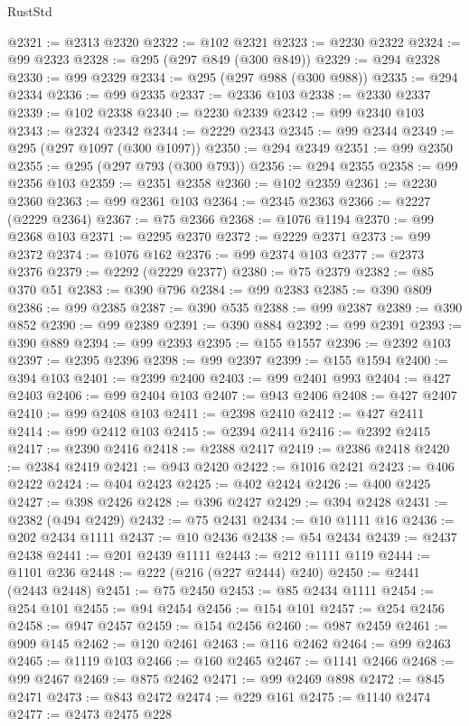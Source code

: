 \begin{lexlean}{RustStd}
\begin{coremodule}
@2321 := @2313 @2320
@2322 := @102 @2321
@2323 := @2230 @2322
@2324 := @99 @2323
@2328 := @295 (@297 @849 (@300 @849))
@2329 := @294 @2328
@2330 := @99 @2329
@2334 := @295 (@297 @988 (@300 @988))
@2335 := @294 @2334
@2336 := @99 @2335
@2337 := @2336 @103
@2338 := @2330 @2337
@2339 := @102 @2338
@2340 := @2230 @2339
@2342 := @99 @2340 @103
@2343 := @2324 @2342
@2344 := @2229 @2343
@2345 := @99 @2344
@2349 := @295 (@297 @1097 (@300 @1097))
@2350 := @294 @2349
@2351 := @99 @2350
@2355 := @295 (@297 @793 (@300 @793))
@2356 := @294 @2355
@2358 := @99 @2356 @103
@2359 := @2351 @2358
@2360 := @102 @2359
@2361 := @2230 @2360
@2363 := @99 @2361 @103
@2364 := @2345 @2363
@2366 := @2227 (@2229 @2364)
@2367 := @75 @2366
@2368 := @1076 @1194
@2370 := @99 @2368 @103
@2371 := @2295 @2370
@2372 := @2229 @2371
@2373 := @99 @2372
@2374 := @1076 @162
@2376 := @99 @2374 @103
@2377 := @2373 @2376
@2379 := @2292 (@2229 @2377)
@2380 := @75 @2379
@2382 := @85 @370 @51
@2383 := @390 @796
@2384 := @99 @2383
@2385 := @390 @809
@2386 := @99 @2385
@2387 := @390 @535
@2388 := @99 @2387
@2389 := @390 @852
@2390 := @99 @2389
@2391 := @390 @884
@2392 := @99 @2391
@2393 := @390 @889
@2394 := @99 @2393
@2395 := @155 @1557
@2396 := @2392 @103
@2397 := @2395 @2396
@2398 := @99 @2397
@2399 := @155 @1594
@2400 := @394 @103
@2401 := @2399 @2400
@2403 := @99 @2401 @993
@2404 := @427 @2403
@2406 := @99 @2404 @103
@2407 := @943 @2406
@2408 := @427 @2407
@2410 := @99 @2408 @103
@2411 := @2398 @2410
@2412 := @427 @2411
@2414 := @99 @2412 @103
@2415 := @2394 @2414
@2416 := @2392 @2415
@2417 := @2390 @2416
@2418 := @2388 @2417
@2419 := @2386 @2418
@2420 := @2384 @2419
@2421 := @943 @2420
@2422 := @1016 @2421
@2423 := @406 @2422
@2424 := @404 @2423
@2425 := @402 @2424
@2426 := @400 @2425
@2427 := @398 @2426
@2428 := @396 @2427
@2429 := @394 @2428
@2431 := @2382 (@494 @2429)
@2432 := @75 @2431
@2434 := @10 @1111 @16
@2436 := @202 @2434 @1111
@2437 := @10 @2436
@2438 := @54 @2434
@2439 := @2437 @2438
@2441 := @201 @2439 @1111
@2443 := @212 @1111 @119
@2444 := @1101 @236
@2448 := @222 (@216 (@227 @2444) @240)
@2450 := @2441 (@2443 @2448)
@2451 := @75 @2450
@2453 := @85 @2434 @1111
@2454 := @254 @101
@2455 := @94 @2454
@2456 := @154 @101
@2457 := @254 @2456
@2458 := @947 @2457
@2459 := @154 @2456
@2460 := @987 @2459
@2461 := @909 @145
@2462 := @120 @2461
@2463 := @116 @2462
@2464 := @99 @2463
@2465 := @1119 @103
@2466 := @160 @2465
@2467 := @1141 @2466
@2468 := @99 @2467
@2469 := @875 @2462
@2471 := @99 @2469 @898
@2472 := @845 @2471
@2473 := @843 @2472
@2474 := @229 @161
@2475 := @1140 @2474
@2477 := @2473 @2475 @228

\end{coremodule}
\end{lexlean}
